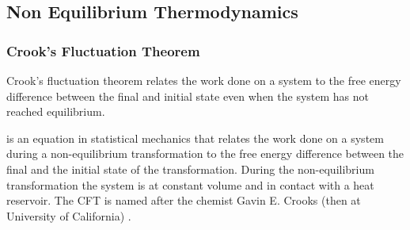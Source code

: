 \documentclass[]{article}
\begin{document}
\subsection{Non Equilibrium Thermodynamics}\label{non-equilibrium-thermodynamics}

\subsubsection{Crook's Fluctuation Theorem}\label{crooks-fluctuation-theorem}

Crook's fluctuation theorem \cite{Crooks-fluctuation99} relates the work
done on a system to the free energy difference between the final and
initial state even when the system has not reached equilibrium.

is an equation in statistical mechanics that relates the work done on a
system during a non-equilibrium transformation to the free energy
difference between the final and the initial state of the
transformation. During the non-equilibrium transformation the system is
at constant volume and in contact with a heat reservoir. The CFT is
named after the chemist Gavin E. Crooks (then at University of
California) \cite{Crooks-fluctuation99}.


\end{document}
